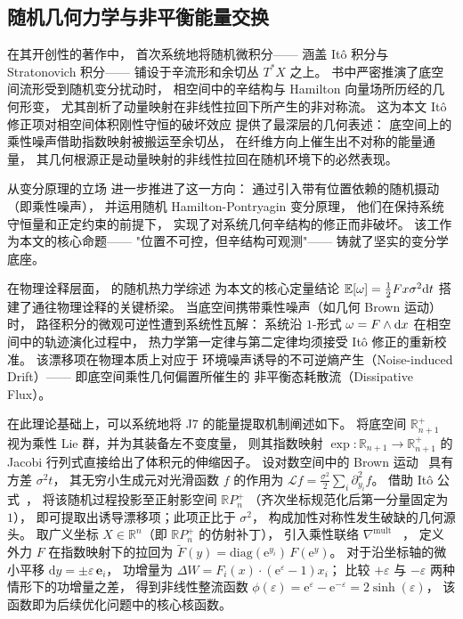 ﻿\documentclass[10pt,a4paper]{article}
\numberwithin{equation}{section}
\begin{document}
\subsection{随机几何力学与非平衡能量交换}

\textcite{Bismut1981} 在其开创性的著作中，
首次系统地将随机微积分——
涵盖 It\^{o} 积分与 Stratonovich 积分——
铺设于辛流形和余切丛 $T^*X$ 之上。
书中严密推演了底空间流形受到随机变分扰动时，
相空间中的辛结构与 Hamilton 向量场所历经的几何形变，
尤其剖析了动量映射在非线性拉回下所产生的非对称流。
这为本文 It\^{o} 修正项对相空间体积刚性守恒的破坏效应
提供了最深层的几何表述：
底空间上的乘性噪声借助指数映射被搬运至余切丛，
在纤维方向上催生出不对称的能量通量，
其几何根源正是动量映射的非线性拉回在随机环境下的必然表现。

\textcite{HolmTyranowski2016} 从变分原理的立场
进一步推进了这一方向：
通过引入带有位置依赖的随机摄动（即乘性噪声），
并运用随机 Hamilton-Pontryagin 变分原理，
他们在保持系统守恒量和正定约束的前提下，
实现了对系统几何辛结构的修正而非破坏。
该工作为本文的核心命题——
"位置不可控，但辛结构可观测"——
铸就了坚实的变分学底座。

在物理诠释层面，\textcite{Seifert2012} 的随机热力学综述
为本文的核心定量结论
$\mathbb E[\omega] = \frac{1}{2}Fx\sigma^2 \text dt$
搭建了通往物理诠释的关键桥梁。
当底空间携带乘性噪声（如几何 Brown 运动）时，
路径积分的微观可逆性遭到系统性瓦解：
系统沿 $1$-形式 $\omega = F \wedge \text dx$
在相空间中的轨迹演化过程中，
热力学第一定律与第二定律均须接受 It\^{o} 修正的重新校准。
该漂移项在物理本质上对应于
环境噪声诱导的不可逆熵产生（Noise-induced Drift）——
即底空间乘性几何偏置所催生的
非平衡态耗散流（Dissipative Flux）。

在此理论基础上，可以系统地将 J7 的能量提取机制阐述如下。
将底空间 $\mathbb R^+_{n+1}$ 视为乘性 Lie 群，并为其装备左不变度量，
则其指数映射 $\exp: \mathbb R_{n+1} \to \mathbb R^+_{n+1}$
的 Jacobi 行列式直接给出了体积元的伸缩因子。
设对数空间中的 Brown 运动~\cite{Nelson1967Dynamical} 
具有方差 $\sigma^2 t$，
其无穷小生成元对光滑函数 $f$ 的作用为
$\mathcal L f = \frac{\sigma^2}{2} \sum_i \partial_{y_i}^2 f$。
借助 It\^{o} 公式~\cite{ItO1951Stochastic,Protter2005Stochastic}，
将该随机过程投影至正射影空间 $\mathbb R P^+_n$
（齐次坐标规范化后第一分量固定为 $1$），
即可提取出诱导漂移项；此项正比于 $\sigma^2$，
构成加性对称性发生破缺的几何源头。
取广义坐标 $X \in \mathbb R^n$（即 $\mathbb R P^+_n$ 的仿射补丁），
引入乘性联络 $\nabla^{\mathrm{mult}}$
~\cite{KobayashiNomizu1963Foundations}，
定义外力 $F$ 在指数映射下的拉回为
$\tilde F(y) = \mathrm{diag}(\mathrm e^{y_i}) \, F(\mathrm e^y)$。
对于沿坐标轴的微小平移 $\mathrm dy = \pm\varepsilon \, \mathbf e_i$，
功增量为 $\Delta W = F_i(x) \cdot (\mathrm e^{\varepsilon} - 1) x_i$；
比较 $+\varepsilon$ 与 $-\varepsilon$ 两种情形下的功增量之差，
得到非线性整流函数
$\phi(\varepsilon) = \mathrm e^{\varepsilon} - \mathrm e^{-\varepsilon} = 2\sinh(\varepsilon)$，
该函数即为后续优化问题中的核心核函数。
\end{document}

